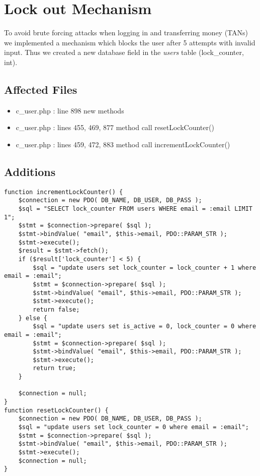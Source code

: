 \chapter{Lock out Mechanism}

To avoid brute forcing attacks when logging in and transferring money (TANs) we implemented a mechanism which blocks the user after 5 attempts with invalid input. Thus we created a new database field in the \textit{users} table (lock\_counter, int). 

\section{Affected Files}
\begin{itemize}
	\item c\_user.php : line 898 new methods
	\item c\_user.php : lines 455, 469, 877  method call resetLockCounter()
		\item c\_user.php : lines 459, 472, 883  method call incrementLockCounter()
\end{itemize}

\section{Additions}

\begin{lstlisting}[caption = New methods]
function incrementLockCounter() {
	$connection = new PDO( DB_NAME, DB_USER, DB_PASS );
	$sql = "SELECT lock_counter FROM users WHERE email = :email LIMIT 1";
	$stmt = $connection->prepare( $sql );
	$stmt->bindValue( "email", $this->email, PDO::PARAM_STR );
	$stmt->execute();
	$result = $stmt->fetch();
	if ($result['lock_counter'] < 5) {
		$sql = "update users set lock_counter = lock_counter + 1 where email = :email";
		$stmt = $connection->prepare( $sql );
		$stmt->bindValue( "email", $this->email, PDO::PARAM_STR );
		$stmt->execute();
		return false;
	} else {
		$sql = "update users set is_active = 0, lock_counter = 0 where email = :email";
		$stmt = $connection->prepare( $sql );
		$stmt->bindValue( "email", $this->email, PDO::PARAM_STR );
		$stmt->execute();
		return true;
	}
	
	$connection = null;
}
function resetLockCounter() {
	$connection = new PDO( DB_NAME, DB_USER, DB_PASS );
	$sql = "update users set lock_counter = 0 where email = :email";
	$stmt = $connection->prepare( $sql );
	$stmt->bindValue( "email", $this->email, PDO::PARAM_STR );
	$stmt->execute();
	$connection = null;
}
\end{lstlisting}
